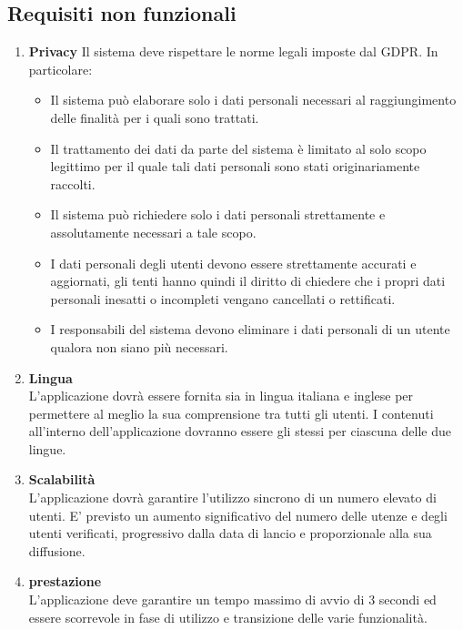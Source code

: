 \documentclass{article}
\begin{document}
\subsection{Requisiti non funzionali}\label{sec:RNF}
    \begin{enumerate}
        \item \textbf{Privacy}\label{sec:RNF1}
        Il sistema deve rispettare le norme legali imposte dal GDPR.
        In particolare:
            \begin{itemize}
                \item Il sistema può elaborare solo i dati personali necessari al raggiungimento delle finalità per i quali sono trattati.
                \item Il trattamento dei dati da parte del sistema è limitato al solo scopo legittimo per il quale tali dati personali sono stati originariamente raccolti.
                \item Il sistema può richiedere solo i dati personali strettamente e assolutamente necessari a tale scopo.
                \item I dati personali degli utenti devono essere strettamente accurati e aggiornati, gli tenti hanno quindi il diritto di chiedere che i propri dati personali inesatti o incompleti vengano cancellati o rettificati.
                \item I responsabili del sistema devono eliminare  i dati personali di un utente qualora non siano più necessari.
            \end{itemize}
        \item \textbf{Lingua}\label{sec:RNF2}\\
        L’applicazione dovrà essere fornita sia in lingua italiana e inglese per permettere al meglio la sua comprensione tra tutti gli utenti. I contenuti all’interno dell’applicazione dovranno essere gli stessi per ciascuna delle due lingue.
        \item \textbf{Scalabilità}\label{sec:RNF3}\\
        L’applicazione dovrà garantire l'utilizzo sincrono di un numero elevato di utenti. E’ previsto un aumento significativo del numero delle utenze e degli utenti verificati, progressivo dalla data di lancio e proporzionale alla sua diffusione.
        \item \textbf{prestazione}\label{sec:RNF4}\\
        L’applicazione deve garantire un tempo massimo di avvio di 3 secondi ed essere scorrevole in fase di utilizzo e transizione delle varie funzionalità.

\end{enumerate}
\end{document}
